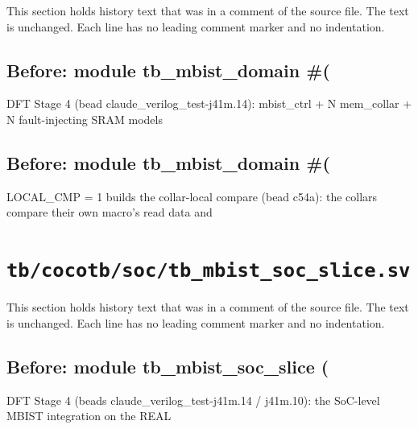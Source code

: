 This section holds history text that was in a comment of the source file. The text is unchanged. Each line has no leading comment marker and no indentation.

\begin{record}

\subsection*{Before: module tb\_mbist\_domain \#(}

\begin{textblock}
DFT Stage 4 (bead claude_verilog_test-j41m.14): mbist_ctrl + N mem_collar + N fault-injecting SRAM models
\end{textblock}

\subsection*{Before: module tb\_mbist\_domain \#(}

\begin{textblock}
LOCAL_CMP = 1 builds the collar-local compare (bead c54a): the collars compare their own macro's read data and
\end{textblock}

\end{record}

\section{\texttt{tb/cocotb/soc/tb\_mbist\_soc\_slice.sv}}\label{cr:suite:soc-tb-mbist-soc-slice-sv}

This section holds history text that was in a comment of the source file. The text is unchanged. Each line has no leading comment marker and no indentation.

\begin{record}

\subsection*{Before: module tb\_mbist\_soc\_slice (}

\begin{textblock}
DFT Stage 4 (beads claude_verilog_test-j41m.14 / j41m.10): the SoC-level MBIST integration on the REAL
\end{textblock}

\end{record}

